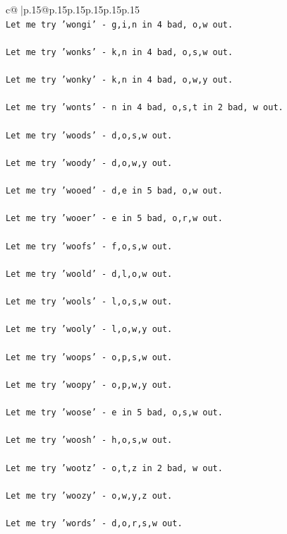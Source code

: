 \documentclass{article}
\begin{document}
{\begin{supertabular}{c@{$\;$}|p{.15\linewidth}@{}p{.15\linewidth}p{.15\linewidth}p{.15\linewidth}p{.15\linewidth}p{.15\linewidth}}
{{{\\ 
\texttt{Let me try 'wongi' {-} g,i,n in 4 bad, o,w out. } \\
\\ 
\texttt{Let me try 'wonks' {-} k,n in 4 bad, o,s,w out. } \\
\\ 
\texttt{Let me try 'wonky' {-} k,n in 4 bad, o,w,y out. } \\
\\ 
\texttt{Let me try 'wonts' {-} n in 4 bad, o,s,t in 2 bad, w out. } \\
\\ 
\texttt{Let me try 'woods' {-} d,o,s,w out. } \\
\\ 
\texttt{Let me try 'woody' {-} d,o,w,y out. } \\
\\ 
\texttt{Let me try 'wooed' {-} d,e in 5 bad, o,w out. } \\
\\ 
\texttt{Let me try 'wooer' {-} e in 5 bad, o,r,w out. } \\
\\ 
\texttt{Let me try 'woofs' {-} f,o,s,w out. } \\
\\ 
\texttt{Let me try 'woold' {-} d,l,o,w out. } \\
\\ 
\texttt{Let me try 'wools' {-} l,o,s,w out. } \\
\\ 
\texttt{Let me try 'wooly' {-} l,o,w,y out. } \\
\\ 
\texttt{Let me try 'woops' {-} o,p,s,w out. } \\
\\ 
\texttt{Let me try 'woopy' {-} o,p,w,y out. } \\
\\ 
\texttt{Let me try 'woose' {-} e in 5 bad, o,s,w out. } \\
\\ 
\texttt{Let me try 'woosh' {-} h,o,s,w out. } \\
\\ 
\texttt{Let me try 'wootz' {-} o,t,z in 2 bad, w out. } \\
\\ 
\texttt{Let me try 'woozy' {-} o,w,y,z out. } \\
\\ 
\texttt{Let me try 'words' {-} d,o,r,s,w out. } \\
}}}
\end{supertabular}}
\end{document}

